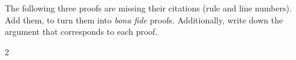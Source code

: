 \begin{practiceproblems}

\problempart
The following three proofs are missing their citations (rule and line numbers). Add them, to turn them into \emph{bona fide} proofs. Additionally, write down the argument that corresponds to each proof.
\begin{multicols}{2}
\begin{fitchproof}
\end{fitchproof}

\begin{fitchproof}
\open
\close
{}
\end{fitchproof}

\end{multicols}





\end{practiceproblems}
